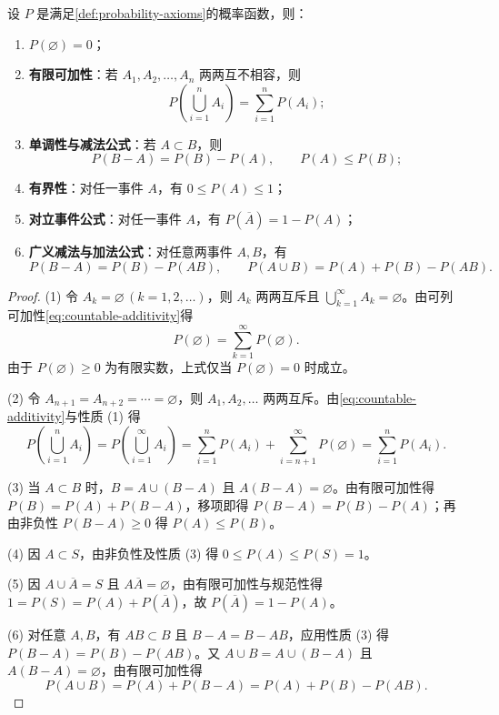 \begin{theorem}[概率的基本性质]
\label{thm:probability-properties}
设 $P$ 是满足\cref{def:probability-axioms}的概率函数，则：
\begin{enumerate}
  \item $P(\varnothing)=0$；
  \item \textbf{有限可加性}：若 $A_1,A_2,\ldots,A_n$ 两两互不相容，则
  \begin{equation}
    P\left(\bigcup_{i=1}^{n}A_i\right)=\sum_{i=1}^{n}P(A_i);
    \label{eq:finite-additivity}
  \end{equation}
  \item \textbf{单调性与减法公式}：若 $A\subset B$，则
  \begin{equation}
    P(B-A)=P(B)-P(A),\qquad P(A)\le P(B);
    \label{eq:monotonicity}
  \end{equation}
  \item \textbf{有界性}：对任一事件 $A$，有 $0\le P(A)\le 1$；
  \item \textbf{对立事件公式}：对任一事件 $A$，有 $P(\overline{A})=1-P(A)$；
  \item \textbf{广义减法与加法公式}：对任意两事件 $A,B$，有
  \begin{equation}
    P(B-A)=P(B)-P(AB),\qquad P(A\cup B)=P(A)+P(B)-P(AB).
    \label{eq:addition-probability}
  \end{equation}
\end{enumerate}
\end{theorem}
\begin{proof}
(1) 令 $A_k=\varnothing\,(k=1,2,\ldots)$，则 $A_k$ 两两互斥且 $\bigcup_{k=1}^{\infty}A_k=\varnothing$。由可列可加性\eqref{eq:countable-additivity}得
\[
  P(\varnothing)=\sum_{k=1}^{\infty}P(\varnothing).
\]
由于 $P(\varnothing)\ge 0$ 为有限实数，上式仅当 $P(\varnothing)=0$ 时成立。

(2) 令 $A_{n+1}=A_{n+2}=\cdots=\varnothing$，则 $A_1,A_2,\ldots$ 两两互斥。由\eqref{eq:countable-additivity}与性质 (1) 得
\[
  P\left(\bigcup_{i=1}^{n}A_i\right)
  =P\left(\bigcup_{i=1}^{\infty}A_i\right)
  =\sum_{i=1}^{n}P(A_i)+\sum_{i=n+1}^{\infty}P(\varnothing)
  =\sum_{i=1}^{n}P(A_i).
\]

(3) 当 $A\subset B$ 时，$B=A\cup(B-A)$ 且 $A(B-A)=\varnothing$。由有限可加性得 $P(B)=P(A)+P(B-A)$，移项即得 $P(B-A)=P(B)-P(A)$；再由非负性 $P(B-A)\ge 0$ 得 $P(A)\le P(B)$。

(4) 因 $A\subset S$，由非负性及性质 (3) 得 $0\le P(A)\le P(S)=1$。

(5) 因 $A\cup\overline{A}=S$ 且 $A\overline{A}=\varnothing$，由有限可加性与规范性得 $1=P(S)=P(A)+P(\overline{A})$，故 $P(\overline{A})=1-P(A)$。

(6) 对任意 $A,B$，有 $AB\subset B$ 且 $B-A=B-AB$，应用性质 (3) 得 $P(B-A)=P(B)-P(AB)$。又 $A\cup B=A\cup(B-A)$ 且 $A(B-A)=\varnothing$，由有限可加性得
\[
  P(A\cup B)=P(A)+P(B-A)=P(A)+P(B)-P(AB).
\]
\end{proof}

